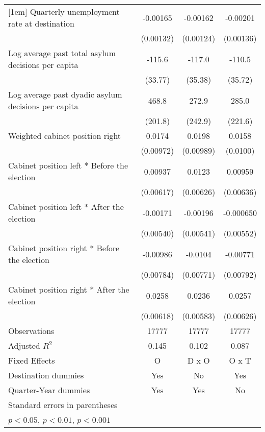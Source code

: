 \begin{table}[htbp]
\begin{tabular}{l*{3}{c}}
[1em]
Quarterly unemployment rate at destination&    -0.00165         &    -0.00162         &    -0.00201         \\
                    &   (0.00132)         &   (0.00124)         &   (0.00136)         \\
[1em]
Log average past total asylum decisions per capita&      -115.6\sym{**} &      -117.0\sym{**} &      -110.5\sym{**} \\
                    &     (33.77)         &     (35.38)         &     (35.72)         \\
[1em]
Log average past dyadic asylum decisions per capita&       468.8\sym{*}  &       272.9         &       285.0         \\
                    &     (201.8)         &     (242.9)         &     (221.6)         \\
[1em]
Weighted cabinet position right&      0.0174         &      0.0198         &      0.0158         \\
                    &   (0.00972)         &   (0.00989)         &    (0.0100)         \\
[1em]
Cabinet position left * Before the election&     0.00937         &      0.0123         &     0.00959         \\
                    &   (0.00617)         &   (0.00626)         &   (0.00636)         \\
[1em]
Cabinet position left * After the election&    -0.00171         &    -0.00196         &   -0.000650         \\
                    &   (0.00540)         &   (0.00541)         &   (0.00552)         \\
[1em]
Cabinet position right * Before the election&    -0.00986         &     -0.0104         &    -0.00771         \\
                    &   (0.00784)         &   (0.00771)         &   (0.00792)         \\
[1em]
Cabinet position right * After the election&      0.0258\sym{***}&      0.0236\sym{***}&      0.0257\sym{***}\\
                    &   (0.00618)         &   (0.00583)         &   (0.00626)         \\
\hline
Observations        &       17777         &       17777         &       17777         \\
Adjusted \(R^{2}\)  &       0.145         &       0.102         &       0.087         \\
Fixed Effects       &           O         &       D x O         &       O x T         \\
Destination dummies &         Yes         &          No         &         Yes         \\
Quarter-Year dummies&         Yes         &         Yes         &          No         \\
\hline\hline
\multicolumn{4}{l}{\footnotesize Standard errors in parentheses}\\
\multicolumn{4}{l}{\footnotesize \sym{*} \(p<0.05\), \sym{**} \(p<0.01\), \sym{***} \(p<0.001\)}\\
\end{tabular}
\end{table}
